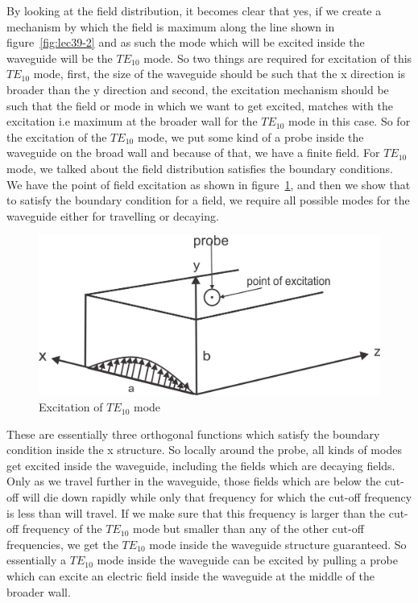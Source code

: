 By looking at the field distribution, it becomes clear that yes, if we create a mechanism by which the field is maximum along the line shown in figure~\ref{fig:lec39-2} and as such the mode which will be excited inside the waveguide will be the $TE_{10}$ mode. So two things are required for excitation of this $TE_{10}$ mode, first, the size of the waveguide should be such that the x direction is broader than the y direction and second, the excitation mechanism should be such that the field or mode in which we want to get excited, matches with the excitation i.e maximum at the broader wall for the $TE_{10}$ mode in this case. So for the excitation of the $TE_{10}$ mode, we put some kind of a probe inside the waveguide on the broad wall and because of that, we have a finite field. For $TE_{10}$ mode, we talked about the field distribution satisfies the boundary conditions. We have the point of field excitation as shown in figure~\ref{fig:lec39-3}, and then we show that to satisfy the boundary condition for a field, we require all possible modes for the waveguide either for travelling or decaying.
\begin{figure}[h]
\centering
\includegraphics[width=1\linewidth]{./graphics/group39-3}
\caption{Excitation of $TE_{10}$ mode}
\label{fig:lec39-3}
\end{figure}

These are essentially three orthogonal functions which satisfy the boundary condition inside the x structure. So locally around the probe, all kinds of modes get excited inside the waveguide, including the fields which are decaying fields. Only as we travel further in the waveguide, those fields which are below the cut-off will die down rapidly while only that frequency for which the cut-off frequency is less than will travel. If we make sure that this frequency is larger than the cut-off frequency of the $TE_{10}$ mode but smaller than any of the other cut-off frequencies, we get the $TE_{10}$ mode inside the waveguide structure guaranteed. So essentially a $TE_{10}$ mode inside the waveguide can be excited by pulling a probe which can excite an electric field inside the waveguide at the middle of the broader wall.

